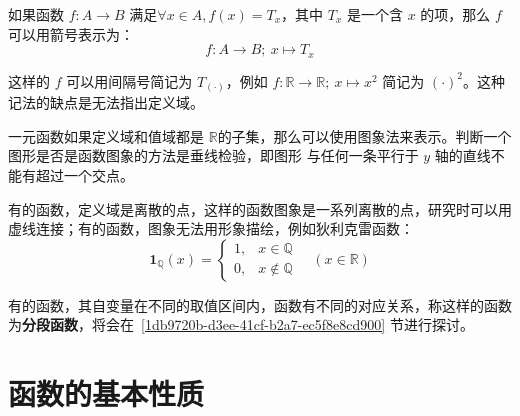\documentclass[a4paper,openany]{ctexbook}
\begin{document}
如果函数 \(f:A \rightarrow B\) 满足\(\forall x \in A,f(x)=T_x\)，其中 \(T_x\) 是一个含 \(x\) 的项，那么 \(f\) 可以用箭号表示为：
\[f:A\rightarrow B;\ x\mapsto T_x\]

这样的 \(f\) 可以用间隔号简记为 \(T_{(\cdot)}\)，例如 \(f:\mathbb{R} \rightarrow \mathbb{R} ;\ x\mapsto x^2\) 简记为 \((\cdot)^2\)。这种记法的缺点是无法指出定义域。

一元函数如果定义域和值域都是 \(\mathbb{R} \)的子集，那么可以使用图象法来表示。判断一个图形是否是函数图象的方法是垂线检验，即图形
与任何一条平行于 \(y\) 轴的直线不能有超过一个交点。

有的函数，定义域是离散的点，这样的函数图象是一系列离散的点，研究时可以用虚线连接；有的函数，图象无法用形象描绘，例如狄利克雷函数：%
\[
    \mathbf{1}_\mathbb{Q}(x)=\begin{cases}
        1, & x\in \mathbb{Q}       \\
        0, & x \not \in \mathbb{Q}
    \end{cases}
    \quad (x \in \mathbb{R})
\]

有的函数，其自变量在不同的取值区间内，函数有不同的对应关系，称这样的函数为\textbf{分段函数}，将会在~\ref{1db9720b-d3ee-41cf-b2a7-ec5f8e8cd900} 节进行探讨。

\section{函数的基本性质}
\end{document}
